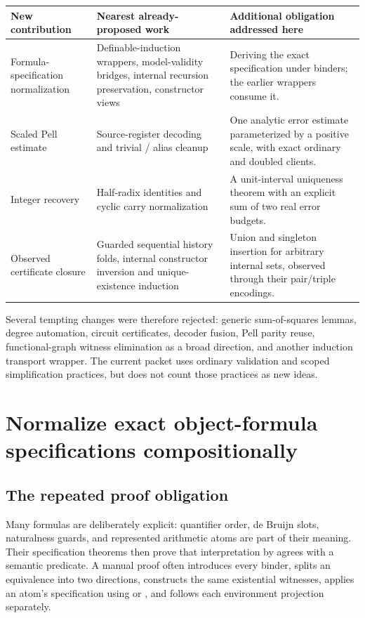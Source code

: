 \documentclass[11pt,a4paper]{article}
\newcommand{\code}[1]{\texttt{\detokenize{#1}}}
\begin{document}
\begin{longtable}{@{}P{36mm}P{55mm}P{58mm}@{}}
\toprule
New contribution & Nearest already-proposed work & Additional obligation addressed here\\
\midrule\endhead
Formula-specification normalization & Definable-induction wrappers, model-validity bridges, internal recursion preservation, constructor views & Deriving the exact \code{Sat} specification under binders; the earlier wrappers consume it.\\[4pt]
Scaled Pell estimate & Source-register decoding and trivial \code{set}/\code{let} alias cleanup & One analytic error estimate parameterized by a positive scale, with exact ordinary and doubled clients.\\[4pt]
Integer recovery & Half-radix identities and cyclic carry normalization & A unit-interval uniqueness theorem with an explicit sum of two real error budgets.\\[4pt]
Observed certificate closure & Guarded sequential history folds, internal constructor inversion and unique-existence induction & Union and singleton insertion for arbitrary internal sets, observed through their pair/triple encodings.\\
\bottomrule
\end{longtable}

Several tempting changes were therefore rejected: generic sum-of-squares
lemmas, degree automation, circuit certificates, decoder fusion, Pell parity
reuse, functional-graph witness elimination as a broad direction, and another
induction transport wrapper. The current packet uses ordinary validation and
scoped simplification practices, but does not count those practices as new
ideas.

\section{Normalize exact object-formula specifications compositionally}
\label{sec:spec}

\subsection{The repeated proof obligation}

Many formulas are deliberately explicit: quantifier order, de Bruijn slots,
naturalness guards, and represented arithmetic atoms are part of their
meaning. Their specification theorems then prove that interpretation by
\code{Sat} agrees with a semantic predicate. A manual proof often introduces
every binder, splits an equivalence into two directions, constructs the same
existential witnesses, applies an atom's specification using \code{.mp} or
\code{.mpr}, and follows each environment projection separately.
\end{document}
